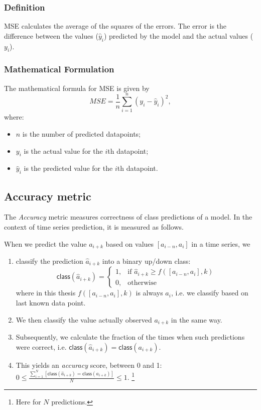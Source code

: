\subsubsection{Definition}
MSE calculates the average of the squares of the errors. The error is the difference between the values (\(\hat{y}_i\)) predicted by the model and the actual values (\(y_i\)).

\subsubsection{Mathematical Formulation}
The mathematical formula for MSE is given by
\begin{equation}
	MSE = \frac{1}{n} \sum_{i=1}^{n} (y_i - \hat{y}_i)^2,
\end{equation}
where:
\begin{itemize}
	\item \(n\) is the number of predicted datapoints;
	\item \(y_i\) is the actual value for the \(i\)th datapoint;
	\item \(\hat{y}_i\) is the predicted value for the \(i\)th datapoint.
\end{itemize}

\subsection{Accuracy metric}
The \emph{Accuracy}\cite{accuracy} metric measures correctness of class predictions of a model. In the context of time series prediction, it is measured as follows.

When we predict the value \(a_{i+k}\) based on values \([a_{i-n}, a_i]\) in a time series, we
\begin{enumerate}
	\item classify the prediction \(\hat{a}_{i+k}\) into a binary up/down class:
	      \[
		      \mathsf{class}(\hat{a}_{i+k}) =
		      \begin{cases}
			      1, & \text{if } \hat{a}_{i+k} \ge f([a_{i-n}, a_i], k) \\
			      0, & \text{otherwise}
		      \end{cases}
	      \]
	      where in this thesis \(f([a_{i-n}, a_i], k)\) is always \(a_i\), i.e. we classify based on last known data point.
	\item We then classify the value actually observed \(a_{i+k}\) in the same way.
	\item Subsequently, we calculate the fraction of the times when such predictions were correct, i.e. \(\mathsf{class}(\hat{a}_{i+k}) = \mathsf{class}(a_{i+k})\).
	\item This yields an \emph{accuracy} score, between 0 and 1: \(0 \leq \frac{\sum_{i=1}^N[\mathsf{class}(\hat{a}_{i+k}) = \mathsf{class}(a_{i+k})]}{N} \leq 1\). \footnote{Here for \(N\) predictions.}
\end{enumerate}
